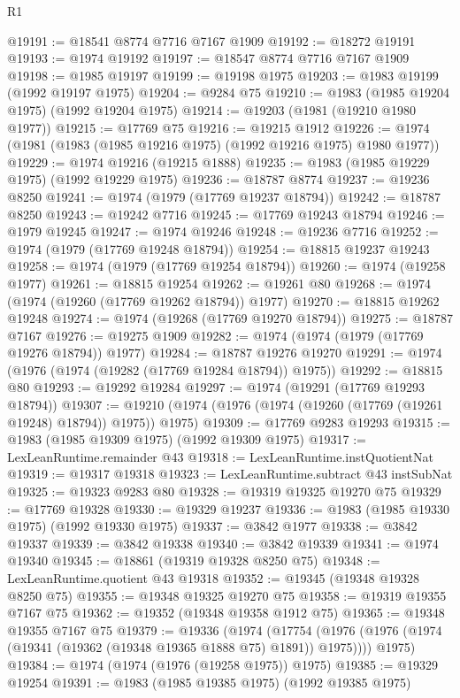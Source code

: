 \begin{lexlean}{R1}
\begin{coremodule}
@19191 := @18541 @8774 @7716 @7167 @1909
@19192 := @18272 @19191
@19193 := @1974 @19192
@19197 := @18547 @8774 @7716 @7167 @1909
@19198 := @1985 @19197
@19199 := @19198 @1975
@19203 := @1983 @19199 (@1992 @19197 @1975)
@19204 := @9284 @75
@19210 := @1983 (@1985 @19204 @1975) (@1992 @19204 @1975)
@19214 := @19203 (@1981 (@19210 @1980 @1977))
@19215 := @17769 @75
@19216 := @19215 @1912
@19226 := @1974 (@1981 (@1983 (@1985 @19216 @1975) (@1992 @19216 @1975) @1980 @1977))
@19229 := @1974 @19216 (@19215 @1888)
@19235 := @1983 (@1985 @19229 @1975) (@1992 @19229 @1975)
@19236 := @18787 @8774
@19237 := @19236 @8250
@19241 := @1974 (@1979 (@17769 @19237 @18794))
@19242 := @18787 @8250
@19243 := @19242 @7716
@19245 := @17769 @19243 @18794
@19246 := @1979 @19245
@19247 := @1974 @19246
@19248 := @19236 @7716
@19252 := @1974 (@1979 (@17769 @19248 @18794))
@19254 := @18815 @19237 @19243
@19258 := @1974 (@1979 (@17769 @19254 @18794))
@19260 := @1974 (@19258 @1977)
@19261 := @18815 @19254
@19262 := @19261 @80
@19268 := @1974 (@1974 (@19260 (@17769 @19262 @18794)) @1977)
@19270 := @18815 @19262 @19248
@19274 := @1974 (@19268 (@17769 @19270 @18794))
@19275 := @18787 @7167
@19276 := @19275 @1909
@19282 := @1974 (@1974 (@1979 (@17769 @19276 @18794)) @1977)
@19284 := @18787 @19276 @19270
@19291 := @1974 (@1976 (@1974 (@19282 (@17769 @19284 @18794)) @1975))
@19292 := @18815 @80
@19293 := @19292 @19284
@19297 := @1974 (@19291 (@17769 @19293 @18794))
@19307 := @19210 (@1974 (@1976 (@1974 (@19260 (@17769 (@19261 @19248) @18794)) @1975)) @1975)
@19309 := @17769 @9283 @19293
@19315 := @1983 (@1985 @19309 @1975) (@1992 @19309 @1975)
@19317 := LexLeanRuntime.remainder @43
@19318 := LexLeanRuntime.instQuotientNat
@19319 := @19317 @19318
@19323 := LexLeanRuntime.subtract @43 instSubNat
@19325 := @19323 @9283 @80
@19328 := @19319 @19325 @19270 @75
@19329 := @17769 @19328
@19330 := @19329 @19237
@19336 := @1983 (@1985 @19330 @1975) (@1992 @19330 @1975)
@19337 := @3842 @1977
@19338 := @3842 @19337
@19339 := @3842 @19338
@19340 := @3842 @19339
@19341 := @1974 @19340
@19345 := @18861 (@19319 @19328 @8250 @75)
@19348 := LexLeanRuntime.quotient @43 @19318
@19352 := @19345 (@19348 @19328 @8250 @75)
@19355 := @19348 @19325 @19270 @75
@19358 := @19319 @19355 @7167 @75
@19362 := @19352 (@19348 @19358 @1912 @75)
@19365 := @19348 @19355 @7167 @75
@19379 := @19336
    (@1974
      (@17754 (@1976 (@1976 (@1974 (@19341 (@19362 (@19348 @19365 @1888 @75) @1891)) @1975))))
      @1975)
@19384 := @1974 (@1974 (@1976 (@19258 @1975)) @1975)
@19385 := @19329 @19254
@19391 := @1983 (@1985 @19385 @1975) (@1992 @19385 @1975)

\end{coremodule}
\end{lexlean}
